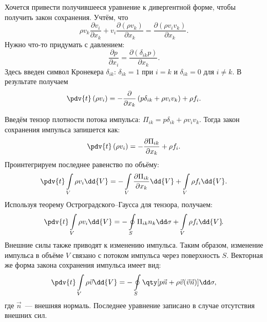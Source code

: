 Хочется привести получившееся уравнение к дивергентной форме, чтобы получить закон сохранения. Учтём, что
\begin{equation}
\rho v _ { k } \frac { \partial v _ { i } } { \partial x _ { k } } + v _ { i } \frac { \partial \left( \rho v _ { k } \right) } { \partial x _ { k } } = \frac { \partial \left( \rho v _ { i } v _ { k } \right) } { \partial x _ { k } }.
\end{equation}
Нужно что-то придумать с давлением:
\begin{equation}
\frac { \partial p } { \partial x _ { i } } = \frac { \partial \left( \delta _ { i k } p \right) } { \partial x _ { k } }.
\end{equation}
Здесь введен символ Кронекера $\delta_{ik}$:  $ \delta _ { i k } = 1 $ при $i = k$ и $\delta _ { i k } = 0$ для $i \neq k $.
В результате получаем
\begin{equation}
\pdv{t} \left( \rho v _ { i } \right) = - \frac { \partial } { \partial x _ { k } } \left( p \delta _ { i k } + \rho v _ { i } v _ { k } \right) + \rho f _ { i }.
\end{equation}

Введём тензор плотности потока импульса: $ \Pi _ { i k } = p \delta _ { i k } + \rho v _ { i } v _ { k } $. Тогда закон сохранения импульса запишется как:
\begin{equation}
\pdv{t} \left( \rho v _ { i } \right) = - \frac { \partial \Pi _ { i k } } { \partial x _ { k } } + \rho f _ { i }.
\end{equation}
Проинтегрируем последнее равенство по объёму:
\begin{equation}
\pdv{t} \int \limits_{ V } \rho v _ { i }\dd{V} = - \int \limits_{ V } \frac { \partial \Pi _ { i k } } { \partial x _ { k } }\dd{V} + \int \limits_{ V } \rho f _ { i }\dd{V}.
\end{equation}
Используя теорему Остроградского--Гаусса для тензора, получаем:
\begin{equation}
\pdv{t} \int \limits_ { V } \rho v _ { i }\dd{V} = - \oint \limits_ { S } \Pi _ { i k } n _ { k } \dd \sigma + \int \limits_ { V } \rho f _ { i }\dd{V}\!.
\end{equation}
Внешние силы также приводят к изменению импульса. Таким образом, изменение импульса в объёме $V$ связано с потоком импульса через поверхность $S$. Векторная же форма закона сохранения импульса имеет вид:
\begin{equation}
\pdv{t} \int \limits_ { V } \rho  \vec{v}\dd{V}  = - \oint \limits_ { S } \qty[\vphantom{\int} p \vec { n } + \rho \vec{v} ( \vec{v} \vec{n} ) ]\dd\sigma,
\end{equation}
где $\vec{n}$~--- внешняя нормаль. Последнее уравнение записано в случае отсутствия внешних сил.

